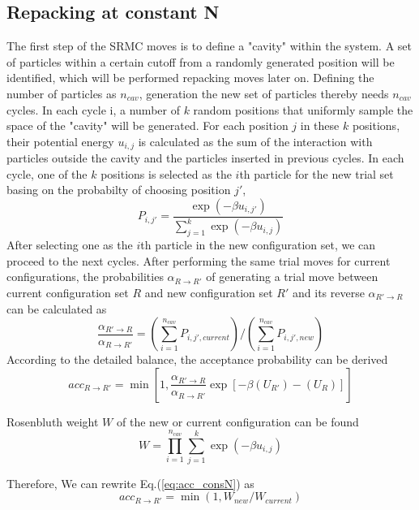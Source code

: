 \documentclass[aip,jcp,12pt]{revtex4-1}
\begin{document}
\subsection{Repacking at constant N}
The first step of the SRMC moves is to define a "cavity" within the system. A set of particles within a certain cutoff from a randomly generated  position will be identified, which will be performed repacking moves later on. Defining the number of particles as $n_{cav}$, generation the new set of particles thereby needs $n_{cav}$ cycles. In each cycle i, a number of $k$ random positions  that uniformly sample the space of the "cavity" will be generated. For each position $j$ in these $k$ positions, their potential energy $u_{i,j}$ is calculated as the sum of the interaction with particles outside the cavity and the particles inserted in previous cycles. In each cycle, one of the $k$ positions is selected as the $i$th particle for the new trial set basing on the probabilty of choosing position $j'$,
\begin{equation}
P_{i,j'} = \frac{\exp(-\beta u_{i,j'})}{\sum\limits_{j=1}^k \exp(-\beta u_{i,j})}
\end{equation}
After selecting one as the $i$th particle in the new configuration set, we can proceed to the next cycles. After performing the same trial moves for current configurations, the probabilities $\alpha_{R\rightarrow R'}$ of generating a trial move between current configuration set $R$ and new configuration set $R'$ and its reverse  $\alpha_{R'\rightarrow R}$ can be calculated as
\begin{equation}
\frac{\alpha_{R'\rightarrow R}}{\alpha_{R\rightarrow R'}} = (\sum\limits_{i=1}^{n_{cav}}P_{i,j',current}) /  (\sum\limits_{i=1}^{n_{cav}}P_{i,j',new})
\end{equation}
According to the detailed balance, the acceptance probability can be derived
\begin{equation}
\label{eq:acc_consN}
acc_{R\rightarrow R'} =\min[1,\frac{\alpha_{R'\rightarrow R}}{\alpha_{R\rightarrow R'}}\exp[-\beta (U_{R'})-(U_{R})]]
\end{equation}

Rosenbluth weight $W$ of the new or current configuration can be found
\begin{equation}
\label{eq:Rosenbluth}
W = \prod\limits_{i=1}^{n_{cav}}\sum\limits_{j=1}^{k} \exp(-\beta u_{i,j})
\end{equation}

Therefore, We can rewrite Eq.(\ref{eq:acc_consN}) as
\begin{equation}
acc_{R\rightarrow R'} =\min(1,W_{new}/W_{current})
\end{equation}
\end{document}

